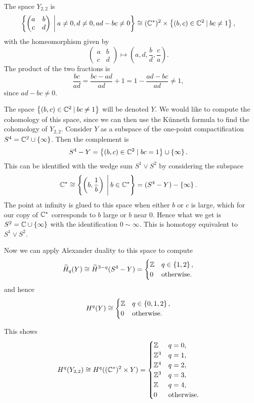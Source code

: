 \begin{example}
  \label{ex:22}

  The space $Y_{2,2}$ is
  \[ \left\{ 
    \begin{pmatrix}
      a & b \\
      c & d
    \end{pmatrix} \:\bigg\vert\: a \neq 0, d \neq 0, ad-bc
    \neq 0  \right\} \cong (\mathbb{C}^*)^2 \times \left\{ (b,c)\in\mathbb{C}^2 \:\vert\:
    bc \neq 1 \right\}, \]
  with the homeomorphism given by
  \[
  \begin{pmatrix}
    a & b\\
    c & d
  \end{pmatrix} \mapsto \left(a,d,\frac{b}{d},\frac{c}{a}\right).\]
  The product of the two fractions is
  \[ \frac{bc}{ad} = \frac{bc-ad}{ad} + 1 = 1-\frac{ad-bc}{ad} \neq
  1, \]
  since $ad-bc \neq 0$.

  The space $\left\{ (b,c) \in \mathbb{C}^2 \:\vert\: bc\neq 1 \right\}$ will be
  denoted $Y$. We would like to compute the cohomology of this space,
  since we can then use the K\"unneth formula to find the cohomology
  of $Y_{2,2}$.
  Consider $Y$ as a subspace of
  the one-point compactification $S^4 = \mathbb{C}^2\cup\left\{ \infty \right\}$. Then the
  complement is
  \[ S^4-Y = \left\{ (b,c)\in \mathbb{C}^2 \mid bc=1 \right\}\cup\left\{ \infty \right\}. \]
  This can be identified with the wedge sum $S^1\vee S^2$ by considering
  the subspace
  \[ \mathbb{C}^* \cong \left\{ \left(b,\frac{1}{b} \right) \:\Bigg\vert\: b\in \mathbb{C}^* \right\} =
  (S^4-Y)-\left\{ \infty \right\}. \]
  The point at infinity is glued to this space when either $b$ or $c$
  is large, which for our copy of $\mathbb{C}^*$
  corresponds to $b$ large or $b$ near 0. Hence what we get is
  $S^2=\mathbb{C}\cup\left\{ \infty \right\}$ with the identification $0 \sim \infty$. This
  is homotopy equivalent to $S^1\vee S^2$.
  
  Now we can apply Alexander duality to this space to compute
  \[ \widetilde H_q(Y) \cong \widetilde H^{3-q}(S^4-Y) =
  \begin{cases}
    \mathbb{Z} & q \in \left\{ 1,2 \right\}, \\
    0 & \text{otherwise}.
  \end{cases} \]
  and hence
  \[ H^q(Y) \cong
  \begin{cases}
    \mathbb{Z} & q \in \left\{ 0,1,2 \right\}, \\
    0 & \text{otherwise}.
  \end{cases} \]
  
  This shows
  \[ H^q(Y_{2,2}) \cong H^q((\mathbb{C}^*)^2\times Y) =
  \begin{cases}
    \mathbb{Z} & q=0, \\
    \mathbb{Z}^3 & q = 1, \\
    \mathbb{Z}^4 & q = 2, \\
    \mathbb{Z}^3 & q = 3, \\
    \mathbb{Z} & q =4, \\
    0 & \text{otherwise}.
  \end{cases} \]
\end{example}

